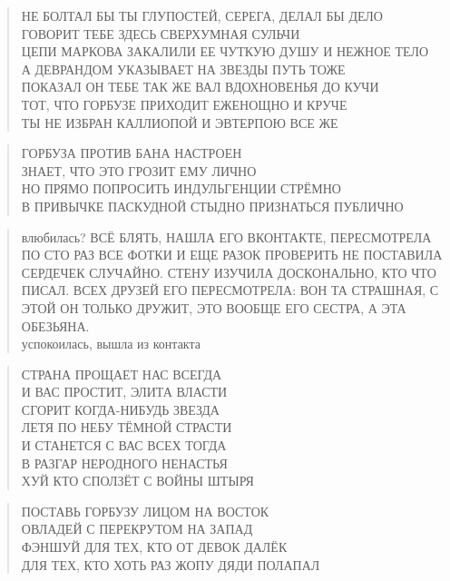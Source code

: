 \poemtitle{***}
\begin{verse}
НЕ БОЛТАЛ БЫ ТЫ ГЛУПОСТЕЙ, СЕРЕГА, ДЕЛАЛ БЫ ДЕЛО\\
ГОВОРИТ ТЕБЕ ЗДЕСЬ СВЕРХУМНАЯ СУЛЬЧИ\\
ЦЕПИ МАРКОВА ЗАКАЛИЛИ ЕЕ ЧУТКУЮ ДУШУ И НЕЖНОЕ ТЕЛО\\
А ДЕВРАНДОМ УКАЗЫВАЕТ НА ЗВЕЗДЫ ПУТЬ ТОЖЕ\\
ПОКАЗАЛ ОН ТЕБЕ ТАК ЖЕ ВАЛ ВДОХНОВЕНЬЯ ДО КУЧИ\\
ТОТ, ЧТО ГОРБУЗЕ ПРИХОДИТ ЕЖЕНОЩНО И КРУЧЕ\\
ТЫ НЕ ИЗБРАН КАЛЛИОПОЙ И ЭВТЕРПОЮ ВСЕ ЖЕ
\end{verse}

\poemtitle{***}
\begin{verse}
ГОРБУЗА ПРОТИВ БАНА НАСТРОЕН\\
ЗНАЕТ, ЧТО ЭТО ГРОЗИТ ЕМУ ЛИЧНО\\
НО ПРЯМО ПОПРОСИТЬ ИНДУЛЬГЕНЦИИ СТРЁМНО\\
В ПРИВЫЧКЕ ПАСКУДНОЙ СТЫДНО ПРИЗНАТЬСЯ ПУБЛИЧНО
\end{verse}

\poemtitle{***}
\begin{verse}
влюбилась? ВСЁ БЛЯТЬ, НАШЛА ЕГО ВКОНТАКТЕ, ПЕРЕСМОТРЕЛА ПО СТО РАЗ ВСЕ ФОТКИ И ЕЩЕ РАЗОК ПРОВЕРИТЬ НЕ ПОСТАВИЛА СЕРДЕЧЕК СЛУЧАЙНО. СТЕНУ ИЗУЧИЛА ДОСКОНАЛЬНО, КТО ЧТО ПИСАЛ. ВСЕХ ДРУЗЕЙ ЕГО ПЕРЕСМОТРЕЛА: ВОН ТА СТРАШНАЯ, С ЭТОЙ ОН ТОЛЬКО ДРУЖИТ, ЭТО ВООБЩЕ ЕГО СЕСТРА, А ЭТА ОБЕЗЬЯНА.\\
успокоилась, вышла из контакта
\end{verse}

\poemtitle{***}
\begin{verse}
СТРАНА ПРОЩАЕТ НАС ВСЕГДА\\
И ВАС ПРОСТИТ, ЭЛИТА ВЛАСТИ\\
СГОРИТ КОГДА-НИБУДЬ ЗВЕЗДА\\
ЛЕТЯ ПО НЕБУ ТЁМНОЙ СТРАСТИ\\
И СТАНЕТСЯ С ВАС ВСЕХ ТОГДА\\
В РАЗГАР НЕРОДНОГО НЕНАСТЬЯ\\
ХУЙ КТО СПОЛЗЁТ С ВОЙНЫ ШТЫРЯ
\end{verse}

\poemtitle{***}
\begin{verse}
ПОСТАВЬ ГОРБУЗУ ЛИЦОМ НА ВОСТОК\\
ОВЛАДЕЙ С ПЕРЕКРУТОМ НА ЗАПАД\\
ФЭНШУЙ ДЛЯ ТЕХ, КТО ОТ ДЕВОК ДАЛЁК\\
ДЛЯ ТЕХ, КТО ХОТЬ РАЗ ЖОПУ ДЯДИ ПОЛАПАЛ
\end{verse}

